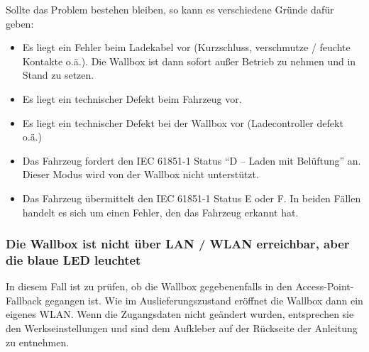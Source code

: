 \documentclass[a4paper,10pt]{article}
\begin{document}
\begin{multicols*}{2}
	Sollte das Problem bestehen bleiben, so kann es verschiedene Gründe dafür
	geben:
	\begin{itemize}
		\item Es liegt ein Fehler beim Ladekabel vor (Kurzschluss, verschmutze / feuchte
		      Kontakte o.ä.). Die Wallbox ist dann sofort außer Betrieb zu nehmen und
		      in Stand zu setzen.
		\item Es liegt ein technischer Defekt beim Fahrzeug vor.
		\item Es liegt ein technischer Defekt bei der Wallbox vor (Ladecontroller defekt o.ä.)
		\item Das Fahrzeug fordert den IEC 61851-1 Status \enquote{D – Laden mit Belüftung}
		      an. Dieser Modus wird von der Wallbox nicht unterstützt.
		\item Das Fahrzeug übermittelt den IEC 61851-1 Status E oder F. In beiden Fällen
		      handelt es sich um einen Fehler, den das Fahrzeug erkannt hat.
	\end{itemize}

	\subsubsection*{Die Wallbox ist nicht über LAN / WLAN erreichbar, aber die blaue LED leuchtet}
	In diesem Fall ist zu prüfen, ob die Wallbox gegebenenfalls in den Access-Point-Fallback
	gegangen ist. Wie im Auslieferungszustand eröffnet die Wallbox dann ein eigenes
	WLAN. Wenn die Zugangsdaten nicht geändert wurden, entsprechen sie den Werkseinstellungen und sind dem
	Aufkleber auf der Rückseite der Anleitung zu entnehmen.


\end{multicols*}
\end{document}
